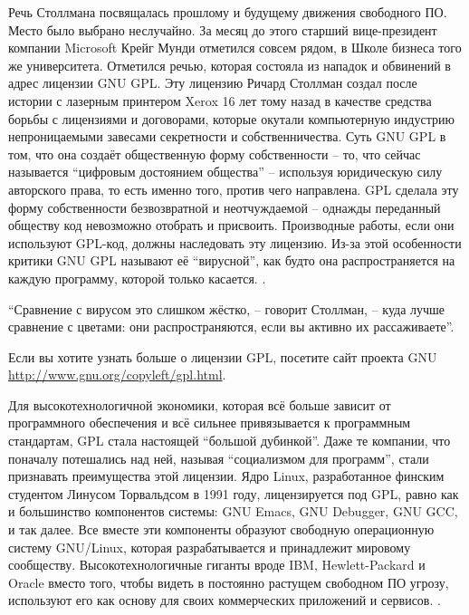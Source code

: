 Речь Столлмана посвящалась прошлому и будущему движения свободного ПО. Место было выбрано неслучайно. За месяц до этого старший вице-президент компании Microsoft Крейг Мунди отметился совсем рядом, в Школе бизнеса того же университета. Отметился речью, которая состояла из нападок и обвинений в адрес лицензии GNU GPL. Эту лицензию Ричард Столлман создал после истории с лазерным принтером Xerox 16 лет тому назад в качестве средства борьбы с лицензиями и договорами, которые окутали компьютерную индустрию непроницаемыми завесами секретности и собственничества. Суть GNU GPL в том, что она создаёт общественную форму собственности -- то, что сейчас называется \enquote{цифровым достоянием общества} -- используя юридическую силу авторского права, то есть именно того, против чего направлена. GPL сделала эту форму собственности безвозвратной и неотчуждаемой -- однажды переданный обществу код невозможно отобрать и присвоить. Производные работы, если они используют GPL-код, должны наследовать эту лицензию. Из-за этой особенности критики GNU GPL называют её \enquote{вирусной}, как будто она распространяется на каждую программу, которой только касается. .

\enquote{Сравнение с вирусом это слишком жёстко, -- говорит Столлман, -- куда лучше сравнение с цветами: они распространяются, если вы активно их рассаживаете}.

Если вы хотите узнать больше о лицензии GPL, посетите сайт проекта GNU \url{http://www.gnu.org/copyleft/gpl.html}.

Для высокотехнологичной экономики, которая всё больше зависит от программного обеспечения и всё сильнее привязывается к программным стандартам, GPL стала настоящей \enquote{большой дубинкой}. Даже те компании, что поначалу потешались над ней, называя \enquote{социализмом для программ}, стали признавать преимущества этой лицензии. Ядро Linux, разработанное финским студентом Линусом Торвальдсом в 1991 году, лицензируется под GPL, равно как и большинство компонентов системы: GNU Emacs, GNU Debugger, GNU GCC, и так далее. Все вместе эти компоненты образуют свободную операционную систему GNU/Linux, которая разрабатывается и принадлежит мировому сообществу. Высокотехнологичные гиганты вроде IBM, Hewlett-Packard и Oracle вместо того, чтобы видеть в постоянно растущем свободном ПО угрозу, используют его как основу для своих коммерческих приложений и сервисов. .

